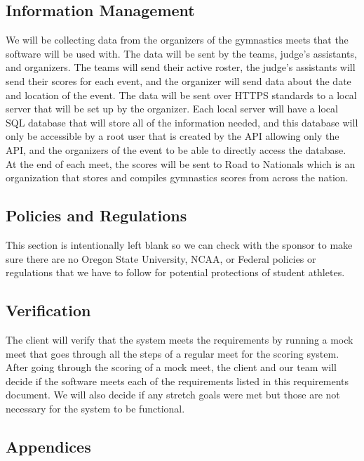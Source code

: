 \documentclass[letterpaper,10pt,draftclsnofoot,onecolumn,]{article}
\begin{document}
\subsection{Information Management}
We will be collecting data from the organizers of the gymnastics meets that the software will be used with. The data will be sent by the teams, judge's assistants, and organizers. The teams will send their active roster, the judge's assistants will send their scores for each event, and the organizer will send data about the date and location of the event. The data will be sent over HTTPS standards to a local server that will be set up by the organizer. Each local server will have a local SQL database that will store all of the information needed, and this database will only be accessible by a root user that is created by the API allowing only the API, and the organizers of the event to be able to directly access the database. At the end of each meet, the scores will be sent to Road to Nationals which is an organization that stores and compiles gymnastics scores from across the nation.

\subsection{Policies and Regulations}
This section is intentionally left blank so we can check with the sponsor to make sure there are no Oregon State University, NCAA, or Federal policies or regulations that we have to follow for potential protections of student athletes.

\begin{center}
\section{Verification}
\end{center}
The client will verify that the system meets the requirements by running a mock meet that goes through all the steps of a regular meet for the scoring system. After going through the scoring of a mock meet, the client and our team will decide if the software meets each of the requirements listed in this requirements document. We will also decide if any stretch goals were met but those are not necessary for the system to be functional. \\

\begin{center}
\section{Appendices}
\end{center}
\end{document}
